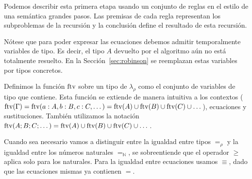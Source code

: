 Podemos describir esta primera etapa usando un conjunto de reglas en el estilo de una semántica grandes pasos. Las premisas de cada regla representan los subproblemas de la recursión y la conclusión define el resultado de esta recursión.

Nótese que para poder expresar las ecuaciones debemos admitir temporalmente variables de tipo. Es decir, el tipo $A$ devuelto por el algoritmo aún no está totalmente resuelto. En la Sección~\ref{sec:robinson} se reemplazan estas variables por tipos concretos. 

\begin{definicion}
    Definimos la función $\text{ftv}$ sobre un tipo de $\lambda_\rho$ como el conjunto de variables de tipo que contiene. Esta función se extiende de manera intuitiva a los contextos ($\text{ftv}(\Gamma)=\text{ftv}(a:A,b:B,c:C,\dots)=\text{ftv}(A)\cup\text{ftv}(B)\cup\text{ftv}(C)\cup\dots$), ecuaciones y sustituciones. También utilizamos la notación $\text{ftv}(A;B;C;\dots) = \text{ftv}(A)\cup\text{ftv}(B)\cup\text{ftv}(C)\cup\dots$.
\end{definicion}

Cuando sea necesario vamos a distinguir entre la igualdad entre tipos $=_\rho$ y la igualdad entre los números naturales $=_\mathbb{N}$, se sobreentiende que el operador $\geq$ aplica solo para los naturales. Para la igualdad entre ecuaciones usamos $\equiv$, dado que las ecuaciones mismas ya contienen $=$.

